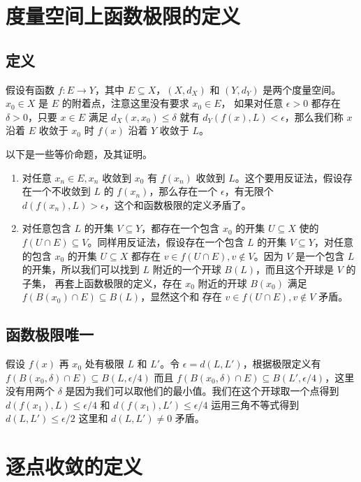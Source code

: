 \section{度量空间上函数极限的定义}

\subsection{定义}

假设有函数 $f: E \to Y$，其中 $E \subseteq X$，$(X, d_X)$ 和 $(Y, d_Y)$ 是两个度量空间。$x_0 \in X $ 是 $E$ 的附着点，注意这里没有要求 $x_0 \in E$，
如果对任意 $ \epsilon > 0$ 都存在 $ \delta > 0$，只要 $x \in E$ 满足 $d_X(x, x_0) \le \delta $ 就有 $d_Y(f(x), L) < \epsilon$，那么我们称 $x$ 沿着 $E$ 收敛于 $x_0$ 时 $f(x)$ 沿着 $Y$ 收敛于 $L$。

以下是一些等价命题，及其证明。

\begin{enumerate}
    \item 对任意 $x_n \in E, x_n$ 收敛到 $x_0$ 有 $f(x_n)$ 收敛到 $L$。这个要用反证法，假设存在一个不收敛到 $L$ 的 $f(x_n)$，那么存在一个 $\epsilon$，有无限个 $d(f(x_n), L) > \epsilon$，这个和函数极限的定义矛盾了。
    \item 对任意包含 $L$ 的开集 $V \subseteq Y$，都存在一个包含 $x_0$ 的开集 $U \subseteq X$ 使的 $f(U \cap E) \subseteq V$。同样用反证法，假设存在一个包含 $L$ 的开集 $V \subseteq Y$，对任意的包含 $x_0$ 的开集 $U \subseteq X$ 都存在 $v \in  f(U \cap E), v \notin V $。因为 $V$ 是一个包含 $L$ 的开集，所以我们可以找到 $L$ 附近的一个开球 $B(L)$，而且这个开球是 $V$ 的子集，
    再套上函数极限的定义，存在 $x_0$ 附近的开球 $B(x_0)$ 满足 $f(B(x_0) \cap E) \subseteq B(L)$，显然这个和 存在 $v \in  f(U \cap E), v \notin V $ 矛盾。
\end{enumerate}

\subsection{函数极限唯一}

假设 $f(x)$ 再 $x_0$ 处有极限 $L$ 和 $L'$。令 $\epsilon = d(L, L')$，根据极限定义有 $f(B(x_0, \delta) \cap E) \subseteq B(L, \epsilon/4)$ 而且 $f(B(x_0, \delta) \cap E) \subseteq B(L', \epsilon/4)$，这里没有用两个 $\delta$ 是因为我们可以取他们的最小值。我们在这个开球取一个点得到 $d(f(x_1), L) \le \epsilon/4 $ 和 $d(f(x_1), L') \le \epsilon/4$ 运用三角不等式得到 $d(L, L') \le  \epsilon/2 $ 这里和 $d(L, L') \ne 0 $ 矛盾。

\section{逐点收敛的定义}

